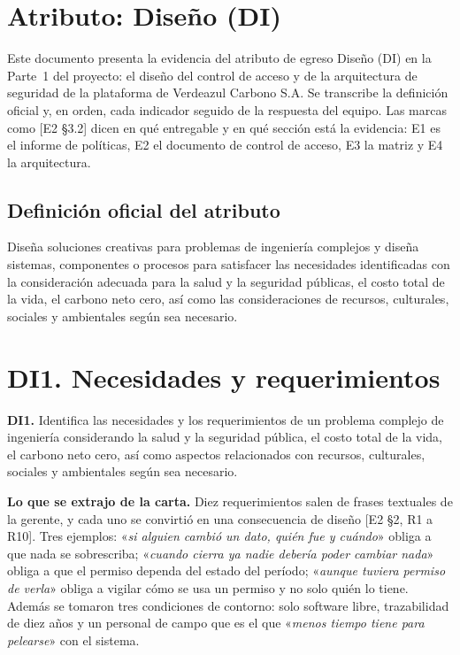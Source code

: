 \documentclass[11pt,letterpaper]{article}
\newcommand{\carta}[1]{«\emph{#1}»}
\newcommand{\ev}[1]{\textrm{\small [#1]}}   %
\begin{document}
\section{Atributo: Diseño (DI)}

Este documento presenta la evidencia del atributo de egreso Diseño (DI) en la Parte~1 del proyecto: el
diseño del control de acceso y de la arquitectura de seguridad de la plataforma de Verdeazul Carbono
S.A. Se transcribe la definición oficial y, en orden, cada indicador seguido de la respuesta del equipo.
Las marcas como \ev{E2 §3.2} dicen en qué entregable y en qué sección está la evidencia: E1 es el
informe de políticas, E2 el documento de control de acceso, E3 la matriz y E4 la arquitectura.

\subsection{Definición oficial del atributo}

\begin{literal}
Diseña soluciones creativas para problemas de ingeniería complejos y diseña sistemas, componentes o
procesos para satisfacer las necesidades identificadas con la consideración adecuada para la salud y la
seguridad públicas, el costo total de la vida, el carbono neto cero, así como las consideraciones de
recursos, culturales, sociales y ambientales según sea necesario.
\end{literal}

\section{DI1. Necesidades y requerimientos}

\begin{literal}
\textbf{DI1.} Identifica las necesidades y los requerimientos de un problema complejo de ingeniería
considerando la salud y la seguridad pública, el costo total de la vida, el carbono neto cero, así como
aspectos relacionados con recursos, culturales, sociales y ambientales según sea necesario.
\end{literal}

\textbf{Lo que se extrajo de la carta.} Diez requerimientos salen de frases textuales de la gerente,
y cada uno se convirtió en una consecuencia de diseño \ev{E2 §2, R1 a R10}. Tres ejemplos: \carta{si
alguien cambió un dato, quién fue y cuándo} obliga a que nada se sobrescriba; \carta{cuando cierra ya
nadie debería poder cambiar nada} obliga a que el permiso dependa del estado del período; \carta{aunque
tuviera permiso de verla} obliga a vigilar cómo se usa un permiso y no solo quién lo tiene. Además se
tomaron tres condiciones de contorno: solo software libre, trazabilidad de diez años y un personal de
campo que es el que \carta{menos tiempo tiene para pelearse} con el sistema.
\end{document}
